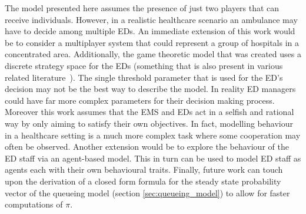The model presented here assumes the presence of just two players that can
receive individuals.
However, in a realistic healthcare scenario an ambulance may have to decide
among multiple EDs.
An immediate extension of this work would be to consider a multiplayer system
that could represent a group of hospitals in a concentrated area.
Additionally, the game theoretic model that was created uses a discrete
strategy space for the EDs (something that is also present in various related
literature~\cite{deo2011centralized, knight2017measuring}).
The single threshold parameter that is used for the ED's decision may not be
the best way to describe the model.
In reality ED managers could have far more complex parameters for their
decision making process.
Moreover this work assumes that the EMS and EDs act in a selfish and rational
way by only aiming to satisfy their own objectives.
In fact, modelling behaviour in a healthcare setting is a much more complex
task where some cooperation may often be observed.
Another extension would be to explore the behaviour of the ED staff via an
agent-based model.
This in turn can be used to model ED staff as agents each with their own
behavioural traits.
Finally, future work can touch upon the derivation of a closed form formula for
the steady state probability vector of the queueing model
(section \ref{sec:queueing_model}) to allow for faster computations of \(\pi\).